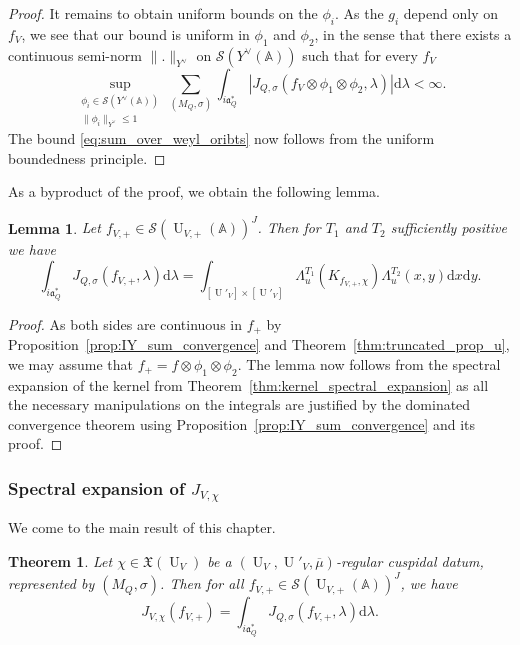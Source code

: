 \documentclass[letterpaper,11pt]{amsart}
\newcommand{\bA}{\mathbb{A}}
\newcommand{\cS}{\mathcal{S}}
\newcommand{\rd}{\mathrm{d}}
\newcommand{\<}{\negthickspace}
\providecommand{\aabs}[1]{\lVert#1\rVert}
\newcommand{\valP}[1]{\left|#1\right|}
\DeclareMathOperator{\U}{U}
\theoremstyle{definition}
\theoremstyle{plain}
\newtheorem{theorem}[definition]{Theorem}
\newtheorem{lemma}[definition]{Lemma}
\theoremstyle{remark}
\numberwithin{equation}{section}
\begin{document}
\begin{proof}
It remains to obtain uniform bounds on the $\phi_i$. As the $g_i$ depend only on $f_V$, we see that our bound is uniform in $\phi_1$ and $\phi_2$, in the sense that there exists a continuous semi-norm $\aabs{.}_{Y^\vee}$ on $\cS(Y^\vee(\bA))$ such that for every $f_V$
\begin{equation*}
    \sup_{\substack{\phi_i \in \cS(Y^\vee(\bA)) \\ \aabs{\phi_i}_{Y^\vee} \leq 1}}\sum_{(M_Q,\sigma)} \int_{ i \mathfrak{a}_Q^*}
    \valP{J_{Q,\sigma}( f_V \otimes \phi_1 \otimes \phi_2,\lambda)} \rd \lambda < \infty.
\end{equation*}
The bound \eqref{eq:sum_over_weyl_oribts} now follows from the uniform boundedness principle.
\end{proof}

As a byproduct of the proof, we obtain the following lemma.
\begin{lemma}
\label{lem:intermediate_regular_expansion}
    Let $f_{V,+} \in \cS(\U_{V,+}(\bA))^J$. Then for $T_1$ and $T_2$ sufficiently positive we have
    \begin{equation}
    \label{eq:selberg_equality}
        \int_{ i \mathfrak{a}_Q^*}
    J_{Q,\sigma}(f_{V,+},\lambda) \rd \lambda=\int_{[\U'_V] \times [\U'_V]} \Lambda_u^{T_1} \left(K_{f_{V,+},\chi} \right)\Lambda_u^{T_2}(x,y) \rd x \rd y.
    \end{equation}
\end{lemma}

\begin{proof}
As both sides are continuous in $f_+$ by Proposition~\ref{prop:IY_sum_convergence} and Theorem~\ref{thm:truncated_prop_u}, we may assume that $f_+ = f \otimes \phi_1
\otimes \phi_2$. The lemma now follows from the spectral expansion of the kernel from Theorem~\ref{thm:kernel_spectral_expansion} as all the necessary manipulations on the integrals are justified by the dominated convergence theorem using Proposition~\ref{prop:IY_sum_convergence} and its proof.
\end{proof}


\subsubsection{Spectral expansion of \texorpdfstring{$J_{V,\chi}$}{the relative character}}

We come to the main result of this chapter.

\begin{theorem} \label{thm:Jchi_spectral}
Let $\chi \in \mathfrak{X}(\U_V)$ be a $(\U_V,\U'_V,\overline{\mu})$-regular cuspidal datum, represented by
$(M_Q, \sigma)$. Then for all $f_{V,+} \in \cS(\U_{V,+}(\bA))^J$, we have
    \begin{equation}    \label{eq:JPi_spectral}
    J_{V,\chi}(f_{V,+})
    =
    \int_{i \mathfrak{a}^*_Q} J_{Q,\sigma}
    (f_{V,+},\lambda) \rd\lambda.
    \end{equation}
\end{theorem}
\end{document}
